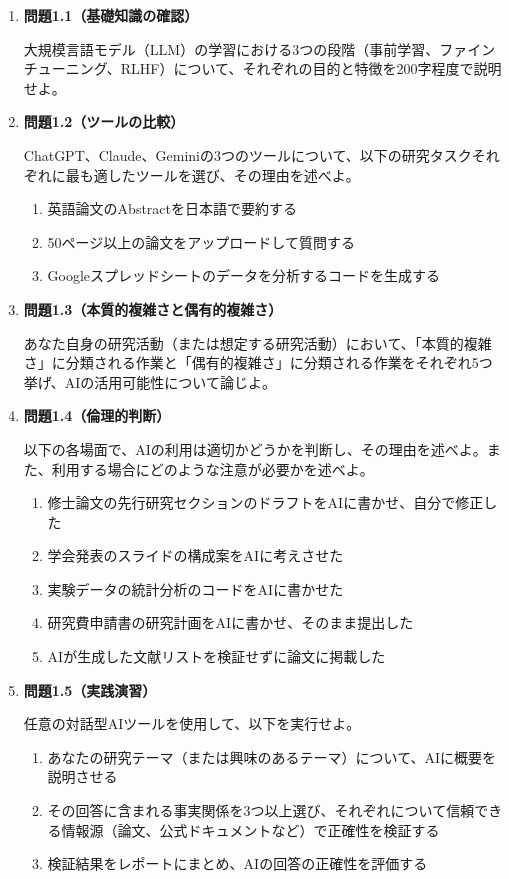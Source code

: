 \begin{enumerate}
\item \textbf{問題1.1（基礎知識の確認）}

大規模言語モデル（LLM）の学習における3つの段階（事前学習、ファインチューニング、RLHF）について、それぞれの目的と特徴を200字程度で説明せよ。

\item \textbf{問題1.2（ツールの比較）}

ChatGPT、Claude、Geminiの3つのツールについて、以下の研究タスクそれぞれに最も適したツールを選び、その理由を述べよ。

\begin{enumerate}
\item[(a)] 英語論文のAbstractを日本語で要約する
\item[(b)] 50ページ以上の論文をアップロードして質問する
\item[(c)] Googleスプレッドシートのデータを分析するコードを生成する
\end{enumerate}

\item \textbf{問題1.3（本質的複雑さと偶有的複雑さ）}

あなた自身の研究活動（または想定する研究活動）において、「本質的複雑さ」に分類される作業と「偶有的複雑さ」に分類される作業をそれぞれ5つ挙げ、AIの活用可能性について論じよ。

\item \textbf{問題1.4（倫理的判断）}

以下の各場面で、AIの利用は適切かどうかを判断し、その理由を述べよ。また、利用する場合にどのような注意が必要かを述べよ。

\begin{enumerate}
\item[(a)] 修士論文の先行研究セクションのドラフトをAIに書かせ、自分で修正した
\item[(b)] 学会発表のスライドの構成案をAIに考えさせた
\item[(c)] 実験データの統計分析のコードをAIに書かせた
\item[(d)] 研究費申請書の研究計画をAIに書かせ、そのまま提出した
\item[(e)] AIが生成した文献リストを検証せずに論文に掲載した
\end{enumerate}

\item \textbf{問題1.5（実践演習）}

任意の対話型AIツールを使用して、以下を実行せよ。

\begin{enumerate}
\item あなたの研究テーマ（または興味のあるテーマ）について、AIに概要を説明させる
\item その回答に含まれる事実関係を3つ以上選び、それぞれについて信頼できる情報源（論文、公式ドキュメントなど）で正確性を検証する
\item 検証結果をレポートにまとめ、AIの回答の正確性を評価する
\end{enumerate}
\end{enumerate}
